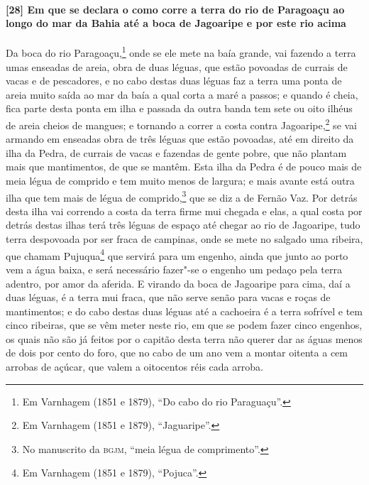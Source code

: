 \begin{linenumbers}
\paragraph{[28] Em que se declara o como corre a terra do rio de Paragoaçu ao longo do mar
da Bahia até a boca de Jagoaripe e por este rio acima}\quad
Da boca do rio Paragoaçu,\footnote{ Em Varnhagem (1851 e 1879), ``Do cabo do rio
Paraguaçu''.} onde se ele mete na baía grande, vai fazendo a terra umas enseadas de areia,
obra de duas léguas, que estão povoadas de currais de vacas e de pescadores, e no cabo
destas duas léguas faz a terra uma ponta de areia muito saída ao mar da baía a qual corta
a maré a passos; e quando é cheia, fica parte desta ponta em ilha e passada da outra banda
tem sete ou oito ilhéus de areia cheios de mangues; e tornando a correr a costa contra
Jagoaripe,\footnote{ Em Varnhagem (1851 e 1879), ``Jaguaripe''.} se vai armando em
enseadas obra de três léguas que estão povoadas, até em direito da ilha da Pedra, de
currais de vacas e fazendas de gente pobre, que não plantam mais que mantimentos, de que
se mantêm. Esta ilha da Pedra é de pouco mais de meia légua de comprido e tem muito menos
de largura; e mais avante está outra ilha que tem mais de légua de comprido,\footnote{ No
manuscrito da \textsc{bgjm}, ``meia légua de comprimento''.} que se diz a de Fernão Vaz.
Por detrás desta ilha vai correndo a costa da terra firme mui chegada e elas, a qual costa
por detrás destas ilhas terá três léguas de espaço até chegar ao rio de Jagoaripe, tudo
terra despovoada por ser fraca de campinas, onde se mete no salgado uma ribeira, que
chamam Pujuqua\footnote{ Em Varnhagem (1851 e 1879), ``Pojuca''.} que servirá para um
engenho, ainda que junto ao porto vem a água baixa, e será necessário fazer"-se o engenho
um pedaço pela terra adentro, por amor da aferida. E virando da boca de Jagoaripe para
cima, daí a duas léguas, é a terra mui fraca, que não serve senão para vacas e roças de
mantimentos; e do cabo destas duas léguas até a cachoeira é a terra sofrível e tem cinco
ribeiras, que se vêm meter neste rio, em que se podem fazer cinco engenhos, os quais não
são já feitos por o capitão desta terra não querer dar as águas menos de dois por cento do
foro, que no cabo de um ano vem a montar oitenta a cem arrobas de açúcar, que valem a
oitocentos réis cada arroba.


\end{linenumbers}

